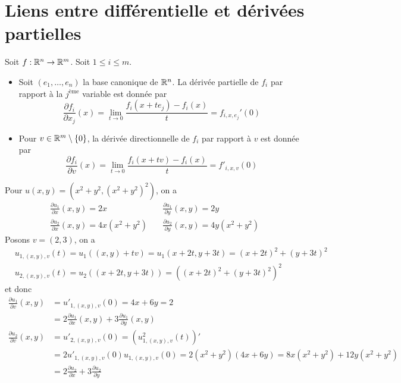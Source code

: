 \section{Liens entre différentielle et dérivées partielles}
\begin{definition}
    Soit $f:\mathbb{R}^n\to \mathbb{R}^m$. Soit $1\leq i\leq m$. 
    \begin{itemize}
        \item Soit $(e_1,\dotsc,e_n)$ la base canonique de $\mathbb{R}^n$. La dérivée partielle de $f_i$ par rapport à la $j^{\text{ème}}$ variable est donnée par 
        \begin{equation*}
            \frac{\partial f_i}{\partial x_j}(x)=\lim_{t\to 0}\frac{f_i(x+te_j)-f_i(x)}{t}=f_{i,x,e_j}'(0)
        \end{equation*}
        \item Pour $v\in \mathbb{R}^m\setminus\{0\}$, la dérivée directionnelle de $f_i$ par rapport à $v$ est donnée par 
        \begin{equation*}
            \frac{\partial f_i}{\partial v}(x)=\lim_{t\to 0}\frac{f_i(x+tv)-f_i(x)}{t}=f'_{i,x,v}(0)
        \end{equation*}
    \end{itemize}
\end{definition}
\begin{exemple}
    Pour $u(x,y)= (x^2+y^2,(x^2+y^2)^2)$, on a 
    \begin{align*}
        \frac{\partial u_1}{\partial x}(x,y)=2x\quad & \frac{\partial u_1}{\partial y}(x,y)=2y\\
        \frac{\partial u_2}{\partial x}(x,y)=4x(x^2+y^2)\quad & \frac{\partial u_2}{\partial y}(x,y)=4y(x^2+y^2)
    \end{align*}
    Posons $v=(2,3)$, on a 
    \begin{align*}
        &u_{1,(x,y),v}(t)=u_1((x,y)+tv)=u_1(x+2t,y+3t)=(x+2t)^2+(y+3t)^2\\
        &u_{2,(x,y),v}(t)= u_2((x+2t,y+3t))=((x+2t)^2+(y+3t)^2)^2
    \end{align*}
    et donc 
    \begin{align*}
        \frac{\partial u_1}{\partial v}(x,y)&=u'_{1,(x,y),v}(0)= 4x+6y=2\\
        &=2\frac{\partial u_1}{\partial x}(x,y)+3\frac{\partial u_1}{\partial y}(x,y)\\
        \frac{\partial u_2}{\partial v}(x,y)&=u'_{2,(x,y),v}(0)=(u^2_{1,(x,y),v}(t))'\\
        &=2u'_{1,(x,y),v}(0)u_{1,(x,y),v}(0)=2(x^2+y^2)(4x+6y)=8x(x^2+y^2)+12y(x^2+y^2)\\
        &= 2\frac{\partial u_2}{\partial x}+3\frac{\partial u_2}{\partial y}
    \end{align*}
\end{exemple}
